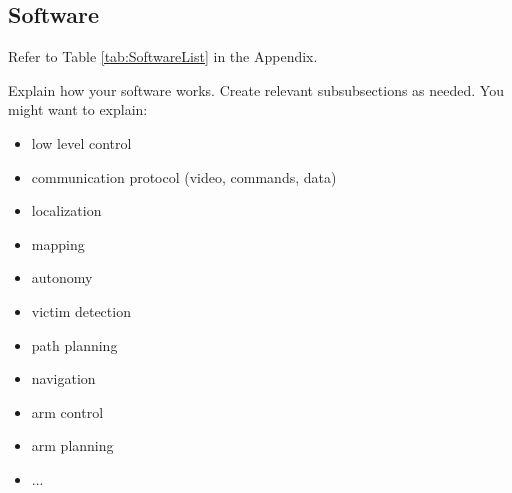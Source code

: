 \subsection{Software}
Refer to Table \ref{tab:SoftwareList} in the Appendix.

Explain how your software works. Create relevant subsubsections as needed. You might want to explain:
\begin{itemize}
  \item low level control
  \item communication protocol (video, commands, data)
  \item localization
  \item mapping
  \item autonomy
  \item victim detection
  \item path planning
  \item navigation
  \item arm control
  \item arm planning
  \item ...
\end{itemize} 
